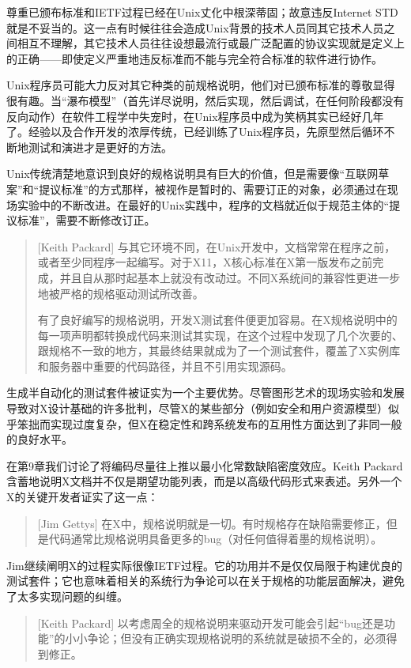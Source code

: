 \documentclass[12pt,oneside]{ctexbook}
\begin{document}
\begin{common-format}
尊重已颁布标准和IETF过程已经在Unix丈化中根深蒂固；故意违反Internet STD就是不妥当的。这一点有时候往往会造成Unix背景的技术人员同其它技术人员之间相互不理解，其它技术人员往往设想最流行或最广泛配置的协议实现就是定义上的正确——即使定义严重地违反标准而不能与完全符合标准的软件进行协作。

Unix程序员可能大力反对其它种类的前规格说明，他们对已颁布标准的尊敬显得很有趣。当“瀑布模型”（首先详尽说明，然后实现，然后调试，在任何阶段都没有反向动作）在软件工程学中失宠时，在Unix程序员中成为笑柄其实已经好几年了。经验以及合作开发的浓厚传统，已经训练了Unix程序员，先原型然后循环不断地测试和演进才是更好的方法。

Unix传统清楚地意识到良好的规格说明具有巨大的价值，但是需要像“互联网草案”和“提议标准”的方式那样，被视作是暂时的、需要订正的对象，必须通过在现场实验中的不断改进。在最好的Unix实践中，程序的文档就近似于规范主体的“提议标准”，需要不断修改订正。

\begin{quote}[Keith Packard]
与其它环境不同，在Unix开发中，文档常常在程序之前，或者至少同程序一起编写。对于X11，X核心标准在X第一版发布之前完成，并且自从那时起基本上就没有改动过。不同X系统间的兼容性更进一步地被严格的规格驱动测试所改善。

有了良好编写的规格说明，开发X测试套件便更加容易。在X规格说明中的每一项声明都转换成代码来测试其实现，在这个过程中发现了几个次要的、跟规格不一致的地方，其最终结果就成为了一个测试套件，覆盖了X实例库和服务器中重要的代码路径，并且不引用实现源码。
\end{quote}

生成半自动化的测试套件被证实为一个主要优势。尽管图形艺术的现场实验和发展导致对X设计基础的许多批判，尽管X的某些部分（例如安全和用户资源模型）似乎笨拙而实现过度复杂，但X在稳定性和跨系统发布的互用性方面达到了非同一般的良好水平。

在第9章我们讨论了将编码尽量往上推以最小化常数缺陷密度效应。Keith Packard含蓄地说明X文档并不仅是期望功能列表，而是以高级代码形式来表述。另外一个X的关键开发者证实了这一点：

\begin{quote}[Jim Gettys]
在X中，规格说明就是一切。有时规格存在缺陷需要修正，但是代码通常比规格说明具备更多的bug（对任何值得着墨的规格说明）。
\end{quote}

Jim继续阐明X的过程实际很像IETF过程。它的功用并不是仅仅局限于构建优良的测试套件；它也意味着相关的系统行为争论可以在关于规格的功能层面解决，避免了太多实现问题的纠缠。

\begin{quote}[Keith Packard]
以考虑周全的规格说明来驱动开发可能会引起“bug还是功能”的小小争论；但没有正确实现规格说明的系统就是破损不全的，必须得到修正。


\end{quote}
\end{common-format}
\end{document}
